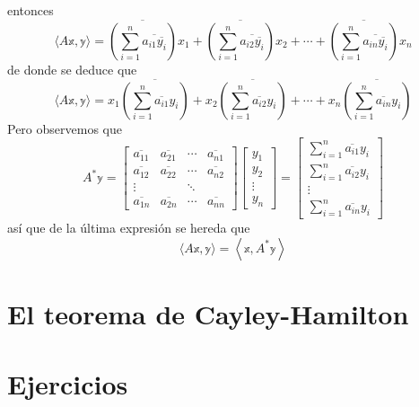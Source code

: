 \begin{theorem}
    entonces
    $$\langle A\mathbb{x}, \mathbb{y} \rangle = \overline{\left( \sum_{i=1}^n \overline{a_{i1} \overline{y_i}} \right)} x_1 + \overline{\left( \sum_{i=1}^n \overline{a_{i2} \overline{y_i}} \right)} x_2 + \cdots + \overline{\left( \sum_{i=1}^n \overline{a_{in} \overline{y_i}} \right)} x_n$$
    de donde se deduce que
    $$\langle A\mathbb{x}, \mathbb{y} \rangle = x_1 \overline{\left( \sum_{i=1}^n \overline{a_{i1}} y_i \right)} + x_2 \overline{\left( \sum_{i=1}^n \overline{a_{i2}} y_i \right)} + \cdots + x_n \overline{\left( \sum_{i=1}^n \overline{a_{in}} y_i \right)}$$
    Pero observemos que
    $$A^* \mathbb{y} = \begin{bmatrix}
        \overline{a_{11}} & \overline{a_{21}} & \cdots & \overline{a_{n1}} \\
        \overline{a_{12}} & \overline{a_{22}} & \cdots & \overline{a_{n2}} \\
        \vdots &  & \ddots & \\
        \overline{a_{1n}} & \overline{a_{2n}} & \cdots & \overline{a_{nn}}
    \end{bmatrix} \begin{bmatrix}
        y_1 \\
        y_2 \\
        \vdots \\
        y_n
    \end{bmatrix} = \begin{bmatrix}
        \displaystyle\sum_{i=1}^n \overline{a_{i1}} y_i \\
        \displaystyle\sum_{i=1}^n \overline{a_{i2}} y_i \\
        \vdots \\
        \displaystyle\sum_{i=1}^n \overline{a_{in}} y_i
    \end{bmatrix}$$
    así que de la última expresión se hereda que
    $$\langle A\mathbb{x}, \mathbb{y} \rangle = \left\langle \mathbb{x}, A^*\mathbb{y} \right\rangle$$
\end{theorem}

\section{El teorema de Cayley-Hamilton}

\newpage

\section{Ejercicios}

